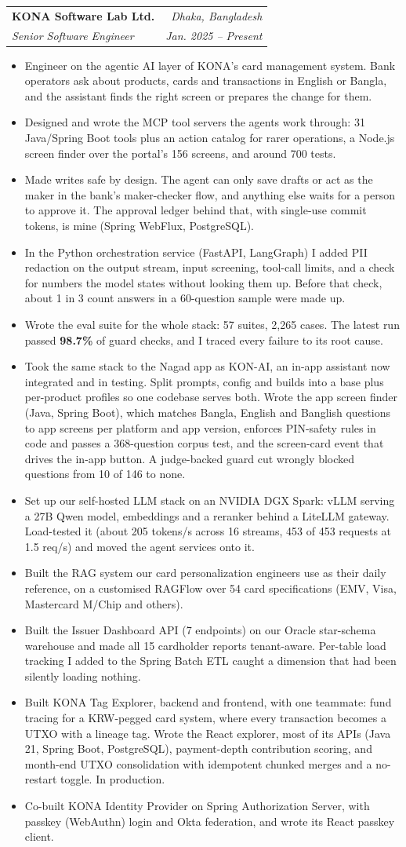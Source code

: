 \documentclass[letterpaper,11pt]{article}
\makeatletter
\newcommand{\resumeItem}[1]{\item\small{{#1 \vspace{-2pt}}}}
\newcommand{\resumeSubheading}[4]{
  \vspace{-2pt}\item
    \begin{tabular*}{0.97\textwidth}[t]{l@{\extracolsep{\fill}}r}
      \textbf{#1} & #2 \\
      \textit{\small#3} & \textit{\small #4} \\
    \end{tabular*}\vspace{-7pt}
}
\newcommand{\resumeItemListStart}{\begin{itemize}[leftmargin=0.2in]}
\newcommand{\resumeItemListEnd}{\end{itemize}\vspace{-5pt}}
\makeatother
\begin{document}
\resumeSubheading
{KONA Software Lab Ltd.}{\emph{Dhaka, Bangladesh}}
{Senior Software Engineer}{\emph{Jan. 2025 -- Present}}
\resumeItemListStart
  \resumeItem{Engineer on the agentic AI layer of KONA's card management system. Bank operators ask about products, cards and transactions in English or Bangla, and the assistant finds the right screen or prepares the change for them.}
  \resumeItem{Designed and wrote the MCP tool servers the agents work through: 31 Java/Spring Boot tools plus an action catalog for rarer operations, a Node.js screen finder over the portal's 156 screens, and around 700 tests.}
  \resumeItem{Made writes safe by design. The agent can only save drafts or act as the maker in the bank's maker-checker flow, and anything else waits for a person to approve it. The approval ledger behind that, with single-use commit tokens, is mine (Spring WebFlux, PostgreSQL).}
  \resumeItem{In the Python orchestration service (FastAPI, LangGraph) I added PII redaction on the output stream, input screening, tool-call limits, and a check for numbers the model states without looking them up. Before that check, about 1 in 3 count answers in a 60-question sample were made up.}
  \resumeItem{Wrote the eval suite for the whole stack: 57 suites, 2,265 cases. The latest run passed \textbf{98.7\%} of guard checks, and I traced every failure to its root cause.}
  \resumeItem{Took the same stack to the Nagad app as KON-AI, an in-app assistant now integrated and in testing. Split prompts, config and builds into a base plus per-product profiles so one codebase serves both. Wrote the app screen finder (Java, Spring Boot), which matches Bangla, English and Banglish questions to app screens per platform and app version, enforces PIN-safety rules in code and passes a 368-question corpus test, and the screen-card event that drives the in-app button. A judge-backed guard cut wrongly blocked questions from 10 of 146 to none.}
  \resumeItem{Set up our self-hosted LLM stack on an NVIDIA DGX Spark: vLLM serving a 27B Qwen model, embeddings and a reranker behind a LiteLLM gateway. Load-tested it (about 205 tokens/s across 16 streams, 453 of 453 requests at 1.5 req/s) and moved the agent services onto it.}
  \resumeItem{Built the RAG system our card personalization engineers use as their daily reference, on a customised RAGFlow over 54 card specifications (EMV, Visa, Mastercard M/Chip and others).}
  \resumeItem{Built the Issuer Dashboard API (7 endpoints) on our Oracle star-schema warehouse and made all 15 cardholder reports tenant-aware. Per-table load tracking I added to the Spring Batch ETL caught a dimension that had been silently loading nothing.}
  \resumeItem{Built KONA Tag Explorer, backend and frontend, with one teammate: fund tracing for a KRW-pegged card system, where every transaction becomes a UTXO with a lineage tag. Wrote the React explorer, most of its APIs (Java 21, Spring Boot, PostgreSQL), payment-depth contribution scoring, and month-end UTXO consolidation with idempotent chunked merges and a no-restart toggle. In production.}
  \resumeItem{Co-built KONA Identity Provider on Spring Authorization Server, with passkey (WebAuthn) login and Okta federation, and wrote its React passkey client.}
\resumeItemListEnd
\end{document}
